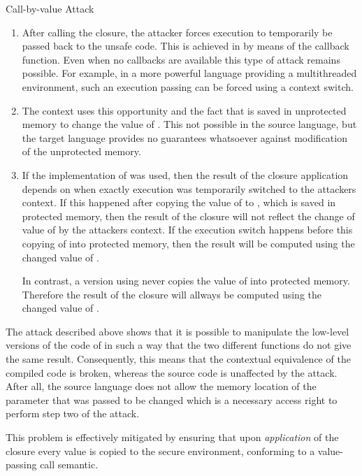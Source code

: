 \begin{attack}{Call-by-value Attack}
\begin{enumerate}
\item After calling the closure, the attacker forces execution to temporarily be passed back to the unsafe code.
This is achieved in  by means of the callback function. 
Even when no callbacks are available this type of attack remains possible. For example, in a more powerful language providing a multithreaded environment, such an execution passing can be forced using a context switch.
\item The context uses this opportunity and the fact that  is saved in unprotected memory to change the value of . This not possible in the source language, but the target language provides no guarantees whatsoever against modification of the unprotected memory.
\item If the implementation of  was used, then the result of the closure application depends on when exactly execution was temporarily switched to the attackers context.
If this happened after copying the value of  to , which is saved in protected memory, then the result of the closure will not reflect the change of value of  by the attackers context.
If the execution switch happens before this copying of  into protected memory, then the result will be computed using the changed value of .

In contrast, a version using   never copies the value of  into protected memory. 
Therefore the result of the closure will allways be computed using the changed value of .
\end{enumerate}
\end{attack}


The attack described above shows that it is possible to manipulate the low-level versions of the code of  in such a way that the two different functions do not give the same result. 
Consequently, this means that the contextual equivalence of the compiled code is broken, whereas the source code is unaffected by the attack.
After all, the source language does not allow the memory location of the parameter that was passed to be changed which is a necessary access right to perform step two of the attack.

This problem is effectively mitigated by ensuring that upon \emph{application} of the closure every value is copied to the secure environment, conforming to a value-passing call semantic.

